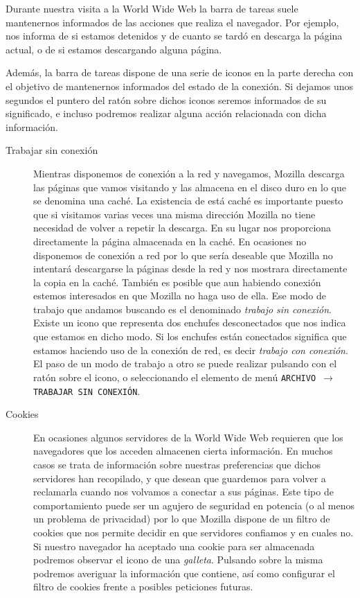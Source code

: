 Durante nuestra  visita a la World  Wide Web la barra  de tareas suele
mantenernos informados de  las acciones que realiza  el navegador. Por
ejemplo, nos informa  de si estamos detenidos y de  cuanto se tardó en
descarga la página actual, o de si estamos descargando alguna página.

Además, la barra de tareas dispone de  una serie de iconos en la parte
derecha con  el objetivo  de mantenernos informados  del estado  de la
conexión. Si dejamos  unos segundos el puntero del  ratón sobre dichos
iconos  seremos  informados  de  su significado,  e  incluso  podremos
realizar alguna acción relacionada con dicha información.

\begin{description}

\item[Trabajar sin conexión] Mientras disponemos  de conexión a la red
y navegamos, {\sf Mozilla} descarga  las páginas que vamos visitando y
las almacena  en el  disco duro en  lo que se  denomina una  caché. La
existencia de está caché es  importante puesto que si visitamos varias
veces una misma dirección {\sf Mozilla} no tiene necesidad de volver a
repetir  la descarga.  En  su lugar  nos  proporciona directamente  la
página almacenada en la caché.  En ocasiones no disponemos de conexión
a  red por  lo  que  sería deseable  que  {\sf  Mozilla} no  intentará
descargarse la  páginas desde  la red y  nos mostrara  directamente la
copia  en la  caché.  También  es posible  que  aun habiendo  conexión
estemos interesados en que {\sf Mozilla} no haga uso de ella. Ese modo
de  trabajo que  andamos buscando  es el  denominado {\em  trabajo sin
conexión}. Existe  un icono que representa  dos enchufes desconectados
que  nos indica  que  estamos en  dicho modo.  Si  los enchufes  están
conectados significa que  estamos haciendo uso de la  conexión de red,
es decir {\em trabajo  con conexión}. El paso de un  modo de trabajo a
otro  se puede  realizar  pulsando  con el  ratón  sobre  el icono,  o
seleccionando el elemento de  menú {\tt ARCHIVO $\rightarrow$ TRABAJAR
SIN CONEXIÓN}.

\item[Cookies] En  ocasiones algunos servidores  de la World  Wide Web
requieren  que  los  navegadores  que  los  acceden  almacenen  cierta
información. En  muchos casos se  trata de información  sobre nuestras
preferencias que  dichos servidores han  recopilado, y que  desean que
guardemos para  volver a reclamarla  cuando nos volvamos a  conectar a
sus  páginas. Este  tipo de  comportamiento  puede ser  un agujero  de
seguridad en  potencia (o al menos  un problema de privacidad)  por lo
que {\sf  Mozilla} dispone  de un  filtro de  cookies que  nos permite
decidir  en  que servidores  confiamos  y  en  cuales no.  Si  nuestro
navegador ha aceptado una cookie para ser almacenada podremos observar
el  icono de  una  {\em  galleta}. Pulsando  sobre  la misma  podremos
averiguar la información  que contiene, así como  configurar el filtro
de cookies frente a posibles peticiones futuras.


\end{description}
